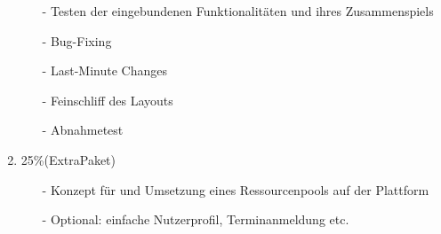 \documentclass{swp}
\begin{document}
\begin{enumerate}
\begin{itemize}
\item[-]Testen der eingebundenen Funktionalit\"aten und ihres Zusammenspiels
\item[-]Bug-Fixing
\item[-]Last-Minute Changes
\item[-]Feinschliff des Layouts
\item[-]Abnahmetest
\end{itemize}
\item 25\%(ExtraPaket)
\begin{itemize}
\item[-]Konzept f\"ur und Umsetzung eines \glqq Ressourcenpools\grqq{} auf der Plattform
\item[-]Optional: einfache Nutzerprofil, Terminanmeldung etc.
\end{itemize}
\end{enumerate}
\end{document}
